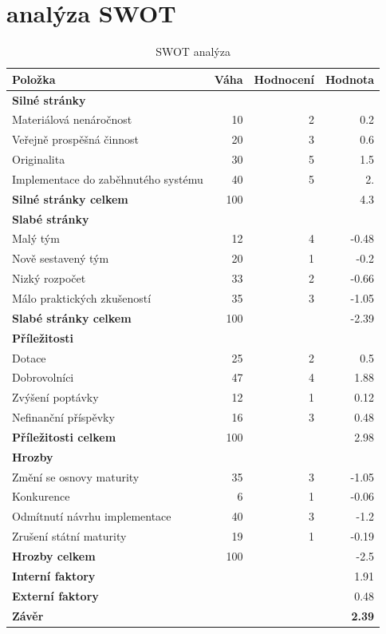 \documentclass[12pt, a4paper]{report}
\begin{document}
\chapter{analýza SWOT}
\label{sec:org2d15258}
\begin{table}[htbp]
\caption{SWOT analýza}
\centering
\begin{tabularx}{\textwidth}{Xrrr}
Položka & Váha & Hodnocení & Hodnota\\
\hline
\textbf{Silné stránky} &  &  & \\
Materiálová nenáročnost & 10 & 2 & 0.2\\
Veřejně prospěšná činnost & 20 & 3 & 0.6\\
Originalita & 30 & 5 & 1.5\\
Implementace do zaběhnutého systému & 40 & 5 & 2.\\
\hline
\textbf{Silné stránky celkem} & 100 &  & 4.3\\
\hline
\textbf{Slabé stránky} &  &  & \\
Malý tým & 12 & 4 & -0.48\\
Nově sestavený tým & 20 & 1 & -0.2\\
Nizký rozpočet & 33 & 2 & -0.66\\
Málo praktických zkušeností & 35 & 3 & -1.05\\
\hline
\textbf{Slabé stránky celkem} & 100 &  & -2.39\\
\hline
\textbf{Příležitosti} &  &  & \\
Dotace & 25 & 2 & 0.5\\
Dobrovolníci & 47 & 4 & 1.88\\
Zvýšení poptávky & 12 & 1 & 0.12\\
Nefinanční příspěvky & 16 & 3 & 0.48\\
\hline
\textbf{Příležitosti celkem} & 100 &  & 2.98\\
\hline
\textbf{Hrozby} &  &  & \\
Změní se osnovy maturity & 35 & 3 & -1.05\\
Konkurence & 6 & 1 & -0.06\\
Odmítnutí návrhu implementace & 40 & 3 & -1.2\\
Zrušení státní maturity & 19 & 1 & -0.19\\
\hline
\textbf{Hrozby celkem} & 100 &  & -2.5\\
\hline
\textbf{Interní faktory} &  &  & 1.91\\
\textbf{Externí faktory} &  &  & 0.48\\
\hline
\textbf{Závěr} &  &  & \textbf{2.39}\\
\end{tabularx}
\end{table}
\end{document}
